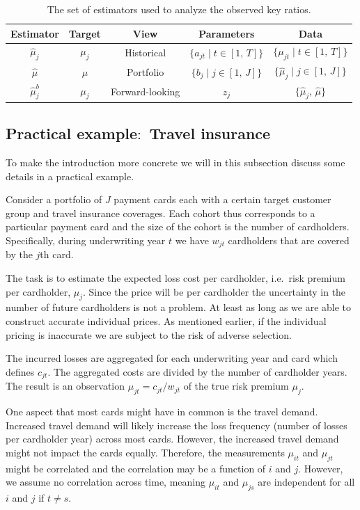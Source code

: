 \documentclass[11pt]{article}
\theoremstyle{definition}
\begin{document}
\begin{table}[H]
\centering
\caption{The set of estimators used to analyze the observed key ratios. }
\label{tab:estimators}
\begin{tabular}{ccccc}
\hline
Estimator     & Target  & View            & Parameters & Data                                   \\ \hline
$\hat\mu_j$ & $\mu_j$ & Historical & $\lbrace a_{jt}\mid t \in [1,\, T] \rbrace$ & $\lbrace \mu_{jt}\mid t \in [1,\, T] \rbrace$  \\
$\hat\mu$   & $\mu$   & Portfolio        & $\lbrace b_j\mid j \in [1,\, J] \rbrace$    & $\lbrace \hat\mu_j\mid j \in [1,\, J] \rbrace$ \\
$\hat\mu_j^b$ & $\mu_j$ & Forward-looking & $z_j$      & $\lbrace \hat\mu_j,\, \hat\mu \rbrace$ \\ \hline
\end{tabular}
\end{table}

\subsection{Practical example$\colon$ Travel insurance}
To make the introduction more concrete we will in this subsection discuss some details in a practical example.

Consider a portfolio of $J$ payment cards each with a certain target customer group and travel insurance coverages. Each cohort thus corresponds to a particular payment card and the size of the cohort is the number of cardholders. Specifically, during underwriting year $t$ we have $w_{jt}$ cardholders that are covered by the $j$th card. 

The task is to estimate the expected loss cost per cardholder, i.e.\ risk premium per cardholder, $\mu_j$. Since the price will be per cardholder the uncertainty in the number of future cardholders is not a problem. At least as long as we are able to construct accurate individual prices. As mentioned earlier, if the individual pricing is inaccurate we are subject to the risk of adverse selection.

The incurred losses are aggregated for each underwriting year and card which defines $c_{jt}$. The aggregated costs are divided by the number of cardholder years. The result is an observation $\mu_{jt} = c_{jt}/w_{jt}$ of the true risk premium $\mu_j$.

One aspect that most cards might have in common is the travel demand. Increased travel demand will likely increase the loss frequency (number of losses per cardholder year) across most cards. However, the increased travel demand might not impact the cards equally. Therefore, the measurements $\mu_{it}$ and $\mu_{jt}$ might be correlated and the correlation may be a function of $i$ and $j$. However, we assume no correlation across time, meaning $\mu_{it}$ and $\mu_{js}$ are independent for all $i$ and $j$ if $t\neq s$.
\end{document}
